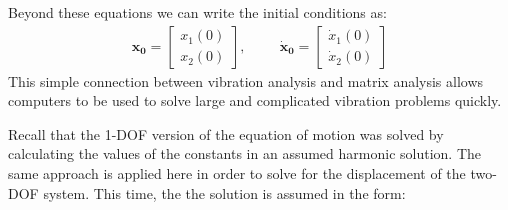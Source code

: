 \documentclass[12pt,letter]{article}
\numberwithin{ex}{section} %
\numberwithin{re}{section} %
\begin{document}
Beyond these equations we can write the initial conditions as:
\begin{eqnarray}
\mathbf{x_0}=  \begin{bmatrix} x_1(0) \\  x_2(0) \end{bmatrix},  \hspace{1cm} \mathbf{\dot{x}_0}=  \begin{bmatrix} \dot{x}_1(0) \\  \dot{x}_2(0) \end{bmatrix}
\end{eqnarray}
This simple connection between vibration analysis and matrix analysis allows computers to be used to solve large and complicated vibration problems quickly.

Recall that the 1-DOF version of the equation of motion was solved by calculating the values of the constants in an assumed harmonic solution. The same approach is applied here in order to solve for the displacement of the two-DOF system. This time, the the solution is assumed in the form:
\end{document}
